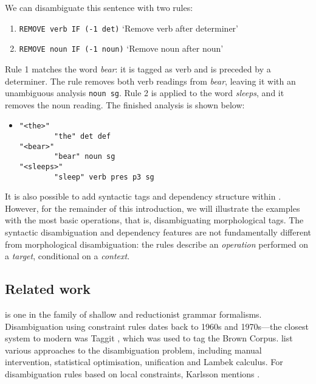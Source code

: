 \noindent We can disambiguate this sentence with two rules:

\begin{enumerate}
\def\labelenumi{\arabic{enumi}.}
\itemsep1pt\parskip0pt
\item \texttt{REMOVE verb IF (-1 det)}
  `Remove verb after determiner'
\item  \texttt{REMOVE noun IF (-1 noun)}
  `Remove noun after noun'
\end{enumerate}

\noindent Rule 1 matches the word \emph{bear}: it is tagged as verb and is
preceded by a determiner. The rule removes both verb readings from
\emph{bear}, leaving it with an unambiguous analysis \texttt{noun sg}.
Rule 2 is applied to the word \emph{sleeps}, and it removes the noun
reading. The finished analysis is shown below:

\begin{itemize}
\item[] 
\begin{verbatim}
"<the>"
        "the" det def
"<bear>"
        "bear" noun sg
"<sleeps>"
        "sleep" verb pres p3 sg
\end{verbatim}
\end{itemize}

It is also possible to add syntactic tags and dependency structure within \onlycg{} \cite{vislcg3,bick2015}.
However, for the remainder of this introduction, we will illustrate the examples with the 
most basic operations, that is, disambiguating morphological tags.
The syntactic disambiguation and dependency features are not fundamentally
different from morphological disambiguation: the rules describe an \emph{operation}
performed on a \emph{target}, conditional on a \emph{context}.

\subsection{Related work}

\onlycg{} is one in the family of shallow and reductionist grammar
formalisms. Disambiguation using constraint rules dates back to 1960s
and 1970s---the closest system to modern \onlycg{} was Taggit
\cite{taggit}, which was used to tag the Brown Corpus.
\citet{karlsson1995constraint} list various approaches to the
disambiguation problem, including manual intervention, statistical
optimisation, unification and Lambek calculus.  For disambiguation
rules based on local constraints, Karlsson mentions
\cite{herz1991local,hindle1989disamrules}.

